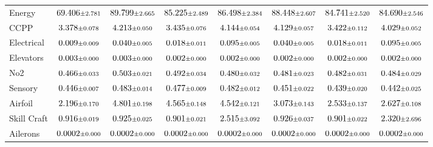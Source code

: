 \begin{table}[!t]
{\begin{tabular}{lccccccc}
Energy & $69.406 \text{\scriptsize$\pm$2.781}$ & $89.799 \text{\scriptsize$\pm$2.665}$ & $85.225 \text{\scriptsize$\pm$2.489}$ & $86.498 \text{\scriptsize$\pm$2.384}$ & $88.448 \text{\scriptsize$\pm$2.607}$ & $84.741 \text{\scriptsize$\pm$2.520}$ & $84.690 \text{\scriptsize$\pm$2.546}$ \\
CCPP & $3.378 \text{\scriptsize$\pm$0.078}$ & $4.213 \text{\scriptsize$\pm$0.050}$ & $3.435 \text{\scriptsize$\pm$0.076}$ & $4.144 \text{\scriptsize$\pm$0.054}$ & $4.129 \text{\scriptsize$\pm$0.057}$ & $3.422 \text{\scriptsize$\pm$0.112}$ & $4.029 \text{\scriptsize$\pm$0.052}$ \\
Electrical & $0.009 \text{\scriptsize$\pm$0.009}$ & $0.040 \text{\scriptsize$\pm$0.005}$ & $0.018 \text{\scriptsize$\pm$0.011}$ & $0.095 \text{\scriptsize$\pm$0.005}$ & $0.040 \text{\scriptsize$\pm$0.005}$ & $0.018 \text{\scriptsize$\pm$0.011}$ & $0.095 \text{\scriptsize$\pm$0.005}$ \\
Elevators & $0.003 \text{\scriptsize$\pm$0.000}$ & $0.003 \text{\scriptsize$\pm$0.000}$ & $0.002 \text{\scriptsize$\pm$0.000}$ & $0.002 \text{\scriptsize$\pm$0.000}$ & $0.002 \text{\scriptsize$\pm$0.000}$ & $0.002 \text{\scriptsize$\pm$0.000}$ & $0.002 \text{\scriptsize$\pm$0.000}$ \\
No2 & $0.466 \text{\scriptsize$\pm$0.033}$ & $0.503 \text{\scriptsize$\pm$0.021}$ & $0.492 \text{\scriptsize$\pm$0.034}$ & $0.480 \text{\scriptsize$\pm$0.032}$ & $0.481 \text{\scriptsize$\pm$0.023}$ & $0.482 \text{\scriptsize$\pm$0.031}$ & $0.484 \text{\scriptsize$\pm$0.029}$ \\
Sensory & $0.446 \text{\scriptsize$\pm$0.007}$ & $0.483 \text{\scriptsize$\pm$0.014}$ & $0.477 \text{\scriptsize$\pm$0.009}$ & $0.482 \text{\scriptsize$\pm$0.012}$ & $0.451 \text{\scriptsize$\pm$0.022}$ & $0.439 \text{\scriptsize$\pm$0.020}$ & $0.442 \text{\scriptsize$\pm$0.025}$ \\
Airfoil & $2.196 \text{\scriptsize$\pm$0.170}$ & $4.801 \text{\scriptsize$\pm$0.198}$ & $4.565 \text{\scriptsize$\pm$0.148}$ & $4.542 \text{\scriptsize$\pm$0.121}$ & $3.073 \text{\scriptsize$\pm$0.143}$ & $2.533 \text{\scriptsize$\pm$0.137}$ & $2.627 \text{\scriptsize$\pm$0.108}$ \\
Skill Craft & $0.916 \text{\scriptsize$\pm$0.019}$ & $0.925 \text{\scriptsize$\pm$0.025}$ & $0.901 \text{\scriptsize$\pm$0.021}$ & $2.515 \text{\scriptsize$\pm$3.092}$ & $0.926 \text{\scriptsize$\pm$0.037}$ & $0.901 \text{\scriptsize$\pm$0.022}$ & $2.320 \text{\scriptsize$\pm$2.696}$ \\
Ailerons & $0.0002 \text{\scriptsize$\pm$0.000}$ & $0.0002 \text{\scriptsize$\pm$0.000}$ & $0.0002 \text{\scriptsize$\pm$0.000}$ & $0.0002 \text{\scriptsize$\pm$0.000}$ & $0.0002 \text{\scriptsize$\pm$0.000}$ & $0.0002 \text{\scriptsize$\pm$0.000}$ & $0.0002 \text{\scriptsize$\pm$0.000}$ \\
\bottomrule
\end{tabular}
}
\end{table}

